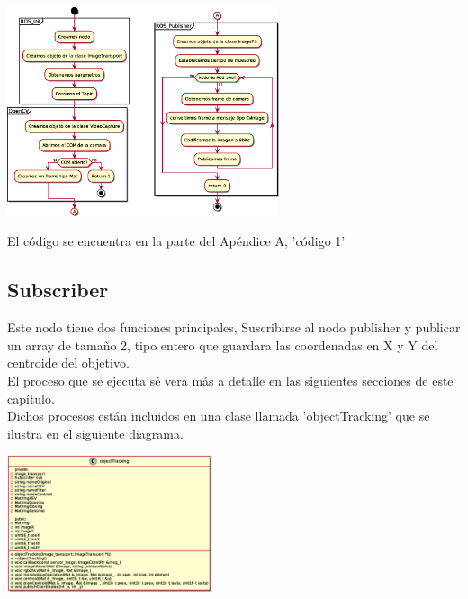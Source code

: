 \begin{center}
	\includegraphics[width=0.6\textwidth]{Contenido/Cuerpo/Capitulo4/publisher.eps}
	\label{Fig5}
\end{center}
El código se encuentra en la parte del Apéndice A, 'código 1'

\subsection{Subscriber}
Este nodo tiene dos funciones principales, Suscribirse al nodo publisher y publicar
un array de tamaño 2, tipo entero que guardara las coordenadas en X y Y del centroide
del objetivo.\\
El proceso que se ejecuta sé vera más a detalle en las siguientes secciones de este
capítulo.\\
Dichos procesos están incluidos en una clase llamada 'objectTracking' que se ilustra
en el siguiente diagrama.
\begin{center}
	\includegraphics[width=0.45\textwidth]{Contenido/Cuerpo/Capitulo4/object_tracking.eps}
	\label{Fig5}
\end{center}



